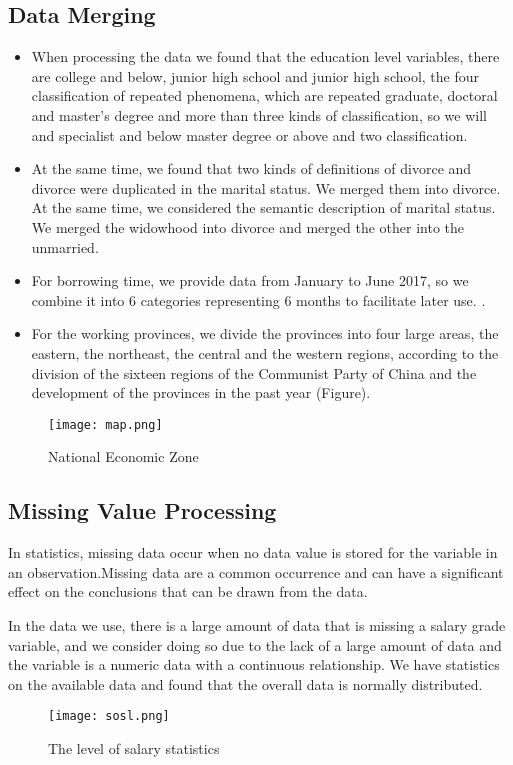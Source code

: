 \documentclass{mcmthesis}
\begin{document}
\subsection{Data Merging}
\begin{itemize}
\item When processing the data we found that the education level variables, there are college and below, junior high school and junior high school, the four classification of repeated phenomena, which are repeated graduate, doctoral and master's degree and more than three kinds of classification, so we will and specialist and below master degree or above and two classification.
\item At the same time, we found that two kinds of definitions of divorce and divorce were duplicated in the marital status. We merged them into divorce. At the same time, we considered the semantic description of marital status. We merged the widowhood into divorce and merged the other into the unmarried.
\item For borrowing time, we provide data from January to June 2017, so we combine it into 6 categories representing 6 months to facilitate later use. .
\item For the working provinces, we divide the provinces into four large areas, the eastern, the northeast, the central and the western regions, according to the division of the sixteen regions of the Communist Party of China and the development of the provinces in the past year (Figure).
\end{itemize}

\begin{figure}[h]
\large
\centering
\texttt{[image: map.png]}
\caption{National Economic Zone} \label{fig:National Economic Zone}
\end{figure}

\subsection{Missing Value Processing}

In statistics, missing data occur when no data value is stored for the variable in an observation.Missing data are a common occurrence and can have a significant effect on the conclusions that can be drawn from the data.

In the data we use, there is a large amount of data that is missing a salary grade variable, and we consider doing so due to the lack of a large amount of data and the variable is a numeric data with a continuous relationship. We have statistics on the available data and found that the overall data is normally distributed.
\newpage
\begin{figure}[h]
\small
\centering
\texttt{[image: sosl.png]}
\caption{The level of salary statistics} \label{fig:The level of salary statistics}
\end{figure}
\end{document}
